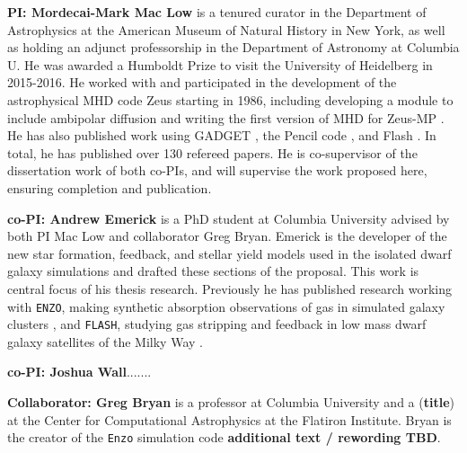\documentclass[11pt]{article}
\begin{document}
\textbf{PI: Mordecai-Mark Mac Low}  is a tenured curator in the Department of Astrophysics at the American
Museum of Natural History in New York, as well as holding an adjunct professorship in the Department of 
Astronomy at Columbia U.  He was awarded a Humboldt Prize to visit the University of Heidelberg in 2015-2016.
He worked with and participated in the
development of the astrophysical MHD code Zeus starting in 1986, including
developing a module to include ambipolar diffusion
\citep{MacLow1995,MacLowSmith1997} and writing the first version of MHD
for Zeus-MP 
\citep{Hayes2006}.  He has also published work using GADGET 
\citep{Li2005,Li2005a,Li2006},
the Pencil code 
\citep{Oishi2007,Johansen2007,Johansen2009,Yang2009,OishiMacLow2009,McNally2014}, and
Flash 
\citep{Joung2006,Joung2009,Peters2010,Peters2010a,Peters2010b,Peters2011,Peters2012,Hill2012,Gatto2015,Girichidis2015SImulatingOutflows,Ibanez-Mejia2016}.
In
total, he has published over 130 refereed papers. He is co-supervisor of the dissertation work of both co-PIs, and
will supervise the work proposed here, ensuring completion and publication.

\textbf{co-PI: Andrew Emerick} is a PhD student at Columbia University advised by both PI Mac Low and collaborator Greg Bryan. Emerick is the developer of the new star formation, feedback, and stellar yield models used in the isolated dwarf galaxy simulations and drafted these sections of the proposal. This work is central focus of his thesis research. Previously he has published research working with \texttt{ENZO}, making synthetic absorption observations of gas in simulated galaxy clusters \citep{Emerick2015}, and \texttt{FLASH}, studying gas stripping and feedback in low mass dwarf galaxy satellites of the Milky Way \citep{Emerick2016}.

\textbf{co-PI: Joshua Wall}.......

\textbf{Collaborator: Greg Bryan} is a professor at Columbia University and a ({\bf title}) at the Center for Computational Astrophysics at the Flatiron Institute. Bryan is the creator of the \texttt{Enzo} simulation code {\bf additional text / rewording TBD}.
\end{document}
